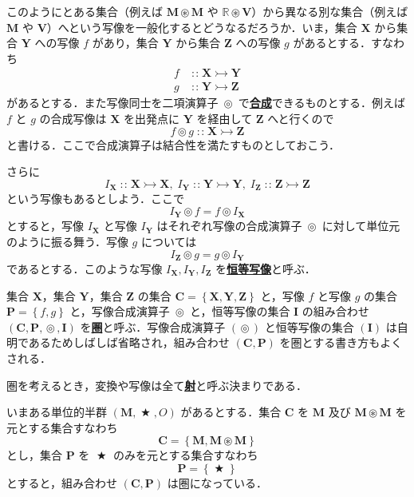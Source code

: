 \documentclass[a4paper,twocolumn]{jsbook}
\newcommand{\keyword}[1]{{\underline{\textbf{#1}}}}
\DeclareMathOperator{\mBinOp}{\bigstar}
\DeclareMathOperator{\mCompProj}{\circledcirc}
\DeclareMathOperator{\mIn}{{:\!:}}
\DeclareMathOperator{\mMorphTo}{\rightarrowtail}
\DeclareMathOperator{\mSetTimes}{\circledast}
\newcommand{\mSet}[1]{\mathbf{#1}}
\newcommand{\mSpecialSet}[1]{\mathbb{#1}} %
\newcommand{\mRSet}{\mSpecialSet{R}}
\newcommand{\mSetWith}[1]{\left\{#1\right\}}
\newcommand{\mTupleWith}[1]{\left(#1\right)}
\newcommand{\mMorph}[2]{#1\mMorphTo#2}
\begin{document}
このようにとある集合（例えば $\mSet{M}\mSetTimes\mSet{M}$ や $\mRSet\mSetTimes\mSet{V}$）から異なる別な集合（例えば $\mSet{M}$ や $\mSet{V}$）へという写像を一般化するとどうなるだろうか．いま，集合 $\mSet{X}$ から集合 $\mSet{Y}$ への写像 $f$ があり，集合 $\mSet{Y}$ から集合 $\mSet{Z}$ への写像 $g$ があるとする．すなわち
\begin{align}
f&\mIn\mMorph{\mSet{X}}{\mSet{Y}}\\
g&\mIn\mMorph{\mSet{Y}}{\mSet{Z}}
\end{align}
があるとする．また写像同士を二項演算子 $\mCompProj$ で\keyword{合成}できるものとする．例えば $f$ と $g$ の合成写像は $\mSet{X}$ を出発点に $\mSet{Y}$ を経由して $\mSet{Z}$ へと行くので
\begin{equation}
f\mCompProj g\mIn\mMorph{\mSet{X}}{\mSet{Z}}
\end{equation}
と書ける．ここで合成演算子は結合性を満たすものとしておこう．

さらに
\begin{equation}
I_\mSet{X}\mIn\mMorph{\mSet{X}}{\mSet{X}},\;
I_\mSet{Y}\mIn\mMorph{\mSet{Y}}{\mSet{Y}},\;
I_\mSet{Z}\mIn\mMorph{\mSet{Z}}{\mSet{Z}}
\end{equation}
という写像もあるとしよう．ここで
\begin{equation}
I_\mSet{Y}\mCompProj f=f\mCompProj I_\mSet{X}
\end{equation}
とすると，写像 $I_\mSet{X}$ と写像 $I_\mSet{Y}$ はそれぞれ写像の合成演算子 $\mCompProj$ に対して単位元のように振る舞う．写像 $g$ については
\begin{equation}
I_\mSet{Z}\mCompProj g=g\mCompProj I_\mSet{Y}
\end{equation}
であるとする．このような写像 $I_\mSet{X},I_\mSet{Y},I_\mSet{Z}$ を\keyword{恒等写像}と呼ぶ．

集合 $\mSet{X}$，集合 $\mSet{Y}$，集合 $\mSet{Z}$ の集合 $\mSet{C}=\mSetWith{\mSet{X},\mSet{Y},\mSet{Z}}$ と，写像 $f$ と写像 $g$ の集合 $\mSet{P}=\mSetWith{f,g}$ と，写像合成演算子 $\mCompProj$ と，恒等写像の集合 $\mSet{I}$ の組み合わせ $\mTupleWith{\mSet{C},\mSet{P},\mCompProj,\mSet{I}}$ を\keyword{圏}と呼ぶ．写像合成演算子 $(\mCompProj)$ と恒等写像の集合 $(\mSet{I})$ は自明であるためしばしば省略され，組み合わせ $\mTupleWith{\mSet{C},\mSet{P}}$ を圏とする書き方もよくされる．

圏を考えるとき，変換や写像は全て\keyword{射}と呼ぶ決まりである．

いまある単位的半群 $\mTupleWith{\mSet{M},\mBinOp,O}$ があるとする．集合 $\mSet{C}$ を $\mSet{M}$ 及び $\mSet{M}\mSetTimes\mSet{M}$ を元とする集合すなわち
\begin{equation}
\mSet{C}=\mSetWith{\mSet{M},\mSet{M}\mSetTimes\mSet{M}}
\end{equation}
とし，集合 $\mSet{P}$ を $\mBinOp$ のみを元とする集合すなわち
\begin{equation}
\mSet{P}=\mSetWith{\mBinOp}
\end{equation}
とすると，組み合わせ $\mTupleWith{\mSet{C},\mSet{P}}$ は圏になっている．
\end{document}
